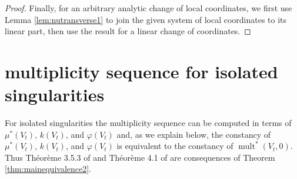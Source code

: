 \documentclass[11pt,a4paper]{amsart}
\newcommand{\1}{{1\!\!1}}
\numberwithin{equation}{section}
\theoremstyle{plain}%
\theoremstyle{definition}
\theoremstyle{definition}
\theoremstyle{remark}
\newcommand{\C}{\mathbb{C}}
\renewcommand{\1}{\mathbf{1}}
\newcommand{\impli}{\varphi}
\newcommand{\point}{P}
\DeclareMathOperator{\snu}{mult}
\newcommand{\unt}{$\nu$-transverse }
\newcommand{\multseq}{multiplicity sequence }
\begin{document}
\begin{proof}
  


Finally, for an arbitrary analytic change of local coordinates,
 we first use Lemma \ref{lem:nutransverse1} to join the given system of local coordinates to its linear part, then use the result for a linear change of coordinates.   
\end{proof}




\section{\multseq for isolated singularities}
\label{sec:isolsing}




For isolated singularities the \multseq can be computed in terms of $\mu^*(V_t)$, $k(V_t)$, and $\varphi (V_t)$ and, as we explain below, the constancy of $\mu^*(V_t)$, $k(V_t)$, and $\varphi (V_t)$ is equivalent to the constancy of $\snu^* (V_t, 0)$.  Thus Théorème 3.5.3 of \cite{brianconspederthese} and Théorème 4.1 
of \cite{brianconhenry80} are consequences of Theorem \ref{thm:mainequivalence2}.  
\end{document}
